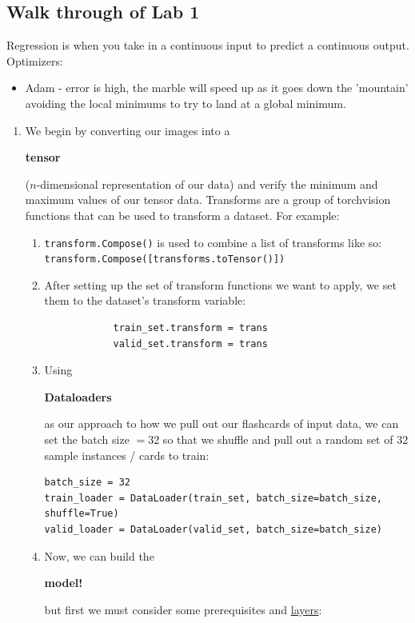 \documentclass{article}
\begin{document}
\subsection{Walk through of Lab 1}
Regression is when you take in a continuous input to predict a continuous output. 
Optimizers:
\begin{itemize}
    \item Adam - error is high, the marble will speed up as it goes down the 'mountain' avoiding the local minimums to try to land at a global minimum.
\end{itemize}
\begin{enumerate}
    \item We begin by converting our images into a \begin{large}\textbf{tensor}\end{large} ($n$-dimensional representation of our data) and verify the minimum and maximum values of our tensor data. Transforms are a group of torchvision functions that can be used to transform a dataset. For example: \begin{enumerate}
        \item \verb|transform.Compose()| is used to combine a list of transforms like so:\\
        \verb|transform.Compose([transforms.toTensor()])|
        \item After setting up the set of transform functions we want to apply, we set them to the dataset's transform variable: \begin{verbatim}
            train_set.transform = trans
            valid_set.transform = trans
        \end{verbatim}
        \item Using \begin{large}\textbf{Dataloaders}\end{large} as our approach to how we pull out our flashcards of input data, we can set the batch size $= 32$ so that we shuffle and pull out a random set of $32$ sample instances / cards to train: \begin{verbatim}
batch_size = 32
train_loader = DataLoader(train_set, batch_size=batch_size, shuffle=True)
valid_loader = DataLoader(valid_set, batch_size=batch_size)
        \end{verbatim}
        \item Now, we can build the \begin{large}\textbf{model!}\end{large} but first we must consider some prerequisites and \href{https://medium.com/@sarita_68521/basic-understanding-of-neural-network-structure-eecc8f149a23}{layers}: 

\end{enumerate}
\end{enumerate}
\end{document}
